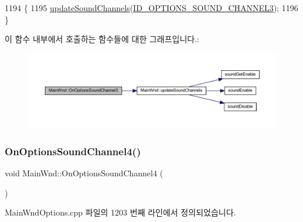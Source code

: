 \begin{DoxyCode}
1194 \{
1195   \mbox{\hyperlink{class_main_wnd_a30b67d9db53d79122684a81e549ebd1c}{updateSoundChannels}}(\mbox{\hyperlink{resource_8h_a10ba0f6233fcb9ef7e885267f0f9b951}{ID\_OPTIONS\_SOUND\_CHANNEL3}});
1196 \}
\end{DoxyCode}
이 함수 내부에서 호출하는 함수들에 대한 그래프입니다.\+:
\nopagebreak
\begin{figure}[H]
\begin{center}
\leavevmode
\includegraphics[width=350pt]{class_main_wnd_afa834c32c467c4c0e60aeea35034336b_cgraph}
\end{center}
\end{figure}
\mbox{\label{class_main_wnd_a1c6886c26731e96cff8cd50c16c42101}} 
\subsubsection{\texorpdfstring{On\+Options\+Sound\+Channel4()}{OnOptionsSoundChannel4()}}
{\footnotesize\ttfamily void Main\+Wnd\+::\+On\+Options\+Sound\+Channel4 (\begin{DoxyParamCaption}{ }\end{DoxyParamCaption})\hspace{0.3cm}{\ttfamily [protected]}}



Main\+Wnd\+Options.\+cpp 파일의 1203 번째 라인에서 정의되었습니다.


